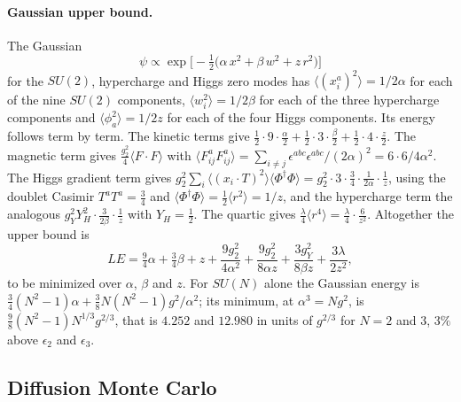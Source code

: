 \paragraph{Gaussian upper bound.}
The Gaussian
\begin{equation}
\psi\propto\exp\big[-\tfrac12\big(\alpha\,x^2+\beta\,w^2+z\,r^2\big)\big]
\end{equation}
for the $SU(2)$, hypercharge and Higgs zero modes has $\langle(x^a_i)^2\rangle=1/2\alpha$ for each of the nine $SU(2)$ components, $\langle w_i^2\rangle=1/2\beta$ for each of the three hypercharge components and $\langle\phi_a^2\rangle=1/2z$ for each of the four Higgs components.
Its energy follows term by term.
The kinetic terms give $\tfrac12\cdot9\cdot\tfrac\alpha2+\tfrac12\cdot3\cdot\tfrac\beta2+\tfrac12\cdot4\cdot\tfrac z2$.
The magnetic term gives $\tfrac{g_2^2}{4}\langle F\cdot F\rangle$ with $\langle F^a_{ij}F^a_{ij}\rangle=\sum_{i\neq j}\epsilon^{abc}\epsilon^{abc}/(2\alpha)^2=6\cdot6/4\alpha^2$.
The Higgs gradient term gives $g_2^2\sum_i\langle(x_i\cdot T)^2\rangle\langle\Phi^\dagger\Phi\rangle=g_2^2\cdot3\cdot\tfrac34\cdot\tfrac1{2\alpha}\cdot\tfrac1z$, using the doublet Casimir $T^aT^a=\tfrac34$ and $\langle\Phi^\dagger\Phi\rangle=\tfrac12\langle r^2\rangle=1/z$, and the hypercharge term the analogous $g_Y^2Y_H^2\cdot\tfrac3{2\beta}\cdot\tfrac1z$ with $Y_H=\tfrac12$.
The quartic gives $\tfrac\lambda4\langle r^4\rangle=\tfrac\lambda4\cdot\tfrac{6}{z^2}$.
Altogether the upper bound is
\begin{equation}
LE=\tfrac94\alpha+\tfrac34\beta+z+\frac{9g_2^2}{4\alpha^2}+\frac{9g_2^2}{8\alpha z}+\frac{3g_Y^2}{8\beta z}+\frac{3\lambda}{2z^2},
\label{eq:rA-gauss-bound}
\end{equation}
to be minimized over $\alpha$, $\beta$ and $z$.
For $SU(N)$ alone the Gaussian energy is $\tfrac34(N^2-1)\alpha+\tfrac38N(N^2-1)g^2/\alpha^2$; its minimum, at $\alpha^3=Ng^2$, is $\tfrac98(N^2-1)N^{1/3}g^{2/3}$, that is $4.252$ and $12.980$ in units of $g^{2/3}$ for $N=2$ and $3$, $3\%$ above $\epsilon_2$ and $\epsilon_3$. %

\subsection{Diffusion Monte Carlo}
\label{rA:zm-dmc}

